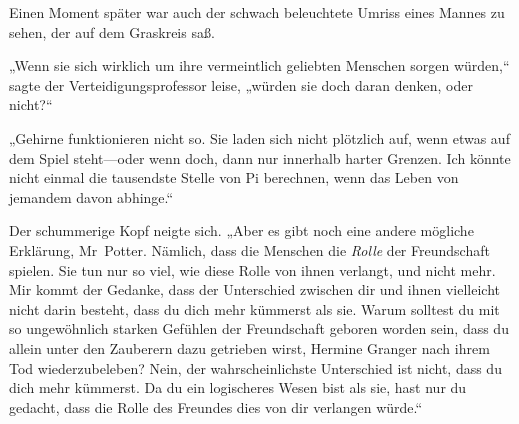 Einen Moment später war auch der schwach beleuchtete Umriss eines Mannes zu sehen, der auf dem Graskreis saß.

„Wenn sie sich wirklich um ihre vermeintlich geliebten Menschen sorgen würden,“ sagte der Verteidigungsprofessor leise, „würden sie doch daran denken, oder nicht?“

„Gehirne funktionieren nicht so. Sie laden sich nicht plötzlich auf, wenn etwas auf dem Spiel steht—oder wenn doch, dann nur innerhalb harter Grenzen. Ich könnte nicht einmal die tausendste Stelle von Pi berechnen, wenn das Leben von jemandem davon abhinge.“

Der schummerige Kopf neigte sich. „Aber es gibt noch eine andere mögliche Erklärung, Mr~Potter. Nämlich, dass die Menschen die \emph{Rolle} der Freundschaft spielen. Sie tun nur so viel, wie diese Rolle von ihnen verlangt, und nicht mehr. Mir kommt der Gedanke, dass der Unterschied zwischen dir und ihnen vielleicht nicht darin besteht, dass du dich mehr kümmerst als sie. Warum solltest du mit so ungewöhnlich starken Gefühlen der Freundschaft geboren worden sein, dass du allein unter den Zauberern dazu getrieben wirst, Hermine Granger nach ihrem Tod wiederzubeleben? Nein, der wahrscheinlichste Unterschied ist nicht, dass du dich mehr kümmerst. Da du ein logischeres Wesen bist als sie, hast nur du gedacht, dass die Rolle des Freundes dies von dir verlangen würde.“

